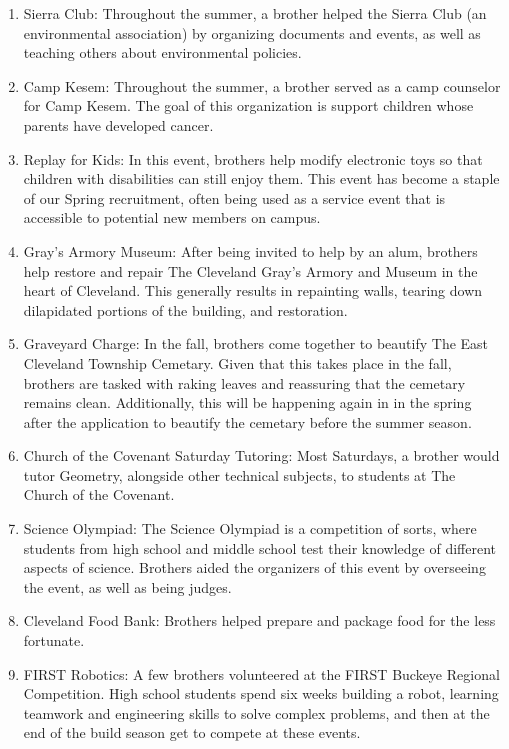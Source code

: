     \begin{enumerate}
      \item Sierra Club: Throughout the summer, a brother helped the Sierra Club (an environmental association) by organizing documents and events, as well as teaching others about environmental policies.
      \item Camp Kesem: Throughout the summer, a brother served as a camp counselor for Camp Kesem. The goal of this organization is support children whose parents have developed cancer.
      \item Replay for Kids: In this event, brothers help modify electronic toys so that children with disabilities can still enjoy them. This event has become a staple of our Spring recruitment, often being used as a service event that is accessible to potential new members on campus.
      \item Gray's Armory Museum: After being invited to help by an alum, brothers help restore and repair The Cleveland Gray's Armory and Museum in the heart of Cleveland. This generally results in repainting walls, tearing down dilapidated portions of the building, and restoration.
      \item Graveyard Charge: In the fall, brothers come together to beautify The East Cleveland Township Cemetary. Given that this takes place in the fall, brothers are tasked with raking leaves and reassuring that the cemetary remains clean. Additionally, this will be happening again in in the spring after the application to beautify the cemetary before the summer season.
      \item Church of the Covenant Saturday Tutoring: Most Saturdays, a brother would tutor Geometry, alongside other technical subjects, to students at The Church of the Covenant.
      \item Science Olympiad: The Science Olympiad is a competition of sorts, where students from high school and middle school test their knowledge of different aspects of science. Brothers aided the organizers of this event by overseeing the event, as well as being judges.
      \item Cleveland Food Bank: Brothers helped prepare and package food for the less fortunate.
      \item FIRST Robotics: A few brothers volunteered at the FIRST Buckeye Regional Competition. High school students spend six weeks building a robot, learning teamwork and engineering skills to solve complex problems, and then at the end of the build season get to compete at these events.

\end{enumerate}
